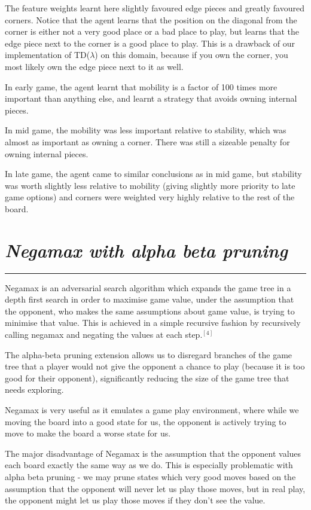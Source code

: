 \documentclass[10pt]{report}
\begin{document}
\begin{multicols}{2}
The feature weights learnt here slightly favoured edge pieces and greatly favoured corners. Notice that the agent learns that the position on the diagonal from the corner is either not a very good place or a bad place to play, but learns that the edge piece next to the corner is a good place to play. This is a drawback of our implementation of TD($\lambda$) on this domain, because if you own the corner, you most likely own the edge piece next to it as well.

In early game, the agent learnt that mobility is a factor of 100 times more important than anything else, and learnt a strategy that avoids owning internal pieces.

In mid game, the mobility was less important relative to stability, which was almost as important as owning a corner. There was still a sizeable penalty for owning internal pieces.

In late game, the agent came to similar conclusions as in mid game, but stability was worth slightly less relative to mobility (giving slightly more priority to late game options) and corners were weighted very highly relative to the rest of the board.

\section*{\emph{Negamax with alpha beta pruning}}
\hrule

Negamax is an adversarial search algorithm which expands the game tree in a depth first search in order to maximise game value, under the assumption that the opponent, who makes the same assumptions about game value, is trying to minimise that value. This is achieved in a simple recursive fashion by recursively calling negamax and negating the values at each step.$^{[4]}$

The alpha-beta pruning extension allows us to disregard branches of the game tree that a player would not give the opponent a chance to play (because it is too good for their opponent), significantly reducing the size of the game tree that needs exploring.

Negamax is very useful as it emulates a game play environment, where while we moving the board into a good state for us, the opponent is actively trying to move to make the board a worse state for us.

The major disadvantage of Negamax is the assumption that the opponent values each board exactly the same way as we do. This is especially problematic with alpha beta pruning - we may prune states which very good moves based on the assumption that the opponent will never let us play those moves, but in real play, the opponent might let us play those moves if they don't see the value.

\end{multicols}
\end{document}
